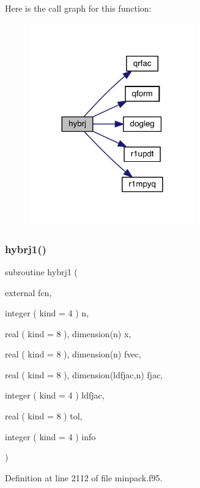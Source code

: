 Here is the call graph for this function\+:\nopagebreak
\begin{figure}[H]
\begin{center}
\leavevmode
\includegraphics[width=203pt]{minpack_8f95_a53ab26dfa98e1e91ba7a8c3e5f83ad13_cgraph}
\end{center}
\end{figure}
\mbox{\label{minpack_8f95_afefee19843910dca7f59c228bf69749d}} 
\subsubsection{\texorpdfstring{hybrj1()}{hybrj1()}}
{\footnotesize\ttfamily subroutine hybrj1 (\begin{DoxyParamCaption}\item[{external}]{fcn,  }\item[{integer ( kind = 4 )}]{n,  }\item[{real ( kind = 8 ), dimension(n)}]{x,  }\item[{real ( kind = 8 ), dimension(n)}]{fvec,  }\item[{real ( kind = 8 ), dimension(ldfjac,n)}]{fjac,  }\item[{integer ( kind = 4 )}]{ldfjac,  }\item[{real ( kind = 8 )}]{tol,  }\item[{integer ( kind = 4 )}]{info }\end{DoxyParamCaption})}



Definition at line 2112 of file minpack.\+f95.


